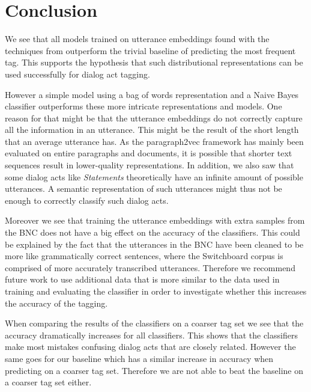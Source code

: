 \section{Conclusion}\label{sec:conclusion}
We see that all models trained on utterance embeddings found with the techniques from  outperform the trivial baseline of predicting the most frequent tag. This supports the hypothesis that such distributional representations can be used successfully for dialog act tagging.

However a simple model using a bag of words representation and a Naive Bayes classifier outperforms these more intricate representations and models.
One reason for that might be that the utterance embeddings do not correctly capture all the information in an utterance. This might be the result of the short length that an average utterance has.
As the paragraph2vec framework has mainly been evaluated on entire paragraphs and documents, it is possible that shorter text sequences result in lower-quality representations.
In addition, we also saw that some dialog acts like \emph{Statements} theoretically have an infinite amount of possible utterances. A semantic representation of such utterances might thus not be enough to correctly classify such dialog acts.

Moreover we see that training the utterance embeddings with extra samples from the BNC does not have a big effect on the accuracy of the classifiers. This could be explained by the fact that the utterances in the BNC have been cleaned to be more like grammatically correct sentences, where the Switchboard corpus is comprised of more accurately transcribed utterances. Therefore we recommend future work to use additional data that is more similar to the data used in training and evaluating the classifier in order to investigate whether this increases the accuracy of the tagging.

When comparing the results of the classifiers on a coarser tag set we see that the accuracy dramatically increases for all classifiers. This shows that the classifiers make most mistakes confusing dialog acts that are closely related. However the same goes for our baseline which has a similar increase in accuracy when predicting on a coarser tag set. Therefore we are not able to beat the baseline on a coarser tag set either.

